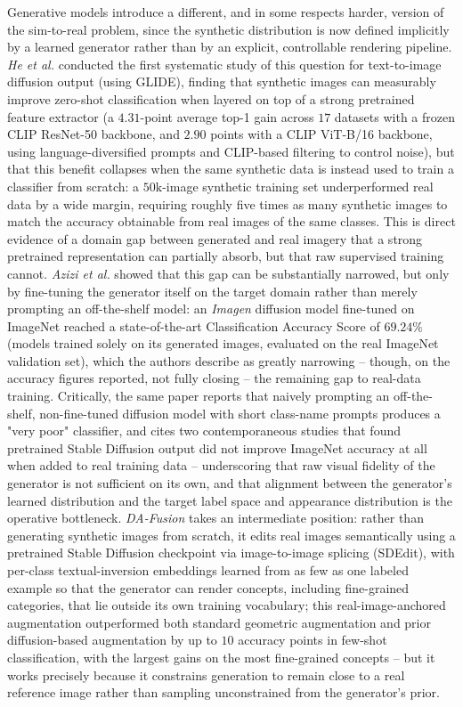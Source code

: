 Generative models introduce a different, and in some respects harder, version of the sim-to-real problem, since the synthetic distribution is now defined implicitly by a learned generator rather than by an explicit, controllable rendering pipeline. \textit{He et al.} \cite{heSyntheticDataGenerative2023} conducted the first systematic study of this question for text-to-image diffusion output (using GLIDE), finding that synthetic images can measurably improve zero-shot classification when layered on top of a strong pretrained feature extractor (a $4.31$-point average top-1 gain across $17$ datasets with a frozen CLIP ResNet-50 backbone, and $2.90$ points with a CLIP ViT-B/16 backbone, using language-diversified prompts and CLIP-based filtering to control noise), but that this benefit collapses when the same synthetic data is instead used to train a classifier from scratch: a $50\mathrm{k}$-image synthetic training set underperformed real data by a wide margin, requiring roughly five times as many synthetic images to match the accuracy obtainable from real images of the same classes. This is direct evidence of a domain gap between generated and real imagery that a strong pretrained representation can partially absorb, but that raw supervised training cannot. \textit{Azizi et al.} \cite{aziziSyntheticDataDiffusion2023} showed that this gap can be substantially narrowed, but only by fine-tuning the generator itself on the target domain rather than merely prompting an off-the-shelf model: an \textit{Imagen} diffusion model fine-tuned on ImageNet reached a state-of-the-art Classification Accuracy Score of $69.24\%$ (models trained solely on its generated images, evaluated on the real ImageNet validation set), which the authors describe as greatly narrowing -- though, on the accuracy figures reported, not fully closing -- the remaining gap to real-data training. Critically, the same paper reports that naively prompting an off-the-shelf, non-fine-tuned diffusion model with short class-name prompts produces a "very poor" classifier, and cites two contemporaneous studies that found pretrained Stable Diffusion output did not improve ImageNet accuracy at all when added to real training data -- underscoring that raw visual fidelity of the generator is not sufficient on its own, and that alignment between the generator's learned distribution and the target label space and appearance distribution is the operative bottleneck. \textit{DA-Fusion} \cite{trabuccoEffectiveDataAugmentation2025} takes an intermediate position: rather than generating synthetic images from scratch, it edits real images semantically using a pretrained Stable Diffusion checkpoint via image-to-image splicing (SDEdit), with per-class textual-inversion embeddings learned from as few as one labeled example so that the generator can render concepts, including fine-grained categories, that lie outside its own training vocabulary; this real-image-anchored augmentation outperformed both standard geometric augmentation and prior diffusion-based augmentation by up to $10$ accuracy points in few-shot classification, with the largest gains on the most fine-grained concepts -- but it works precisely because it constrains generation to remain close to a real reference image rather than sampling unconstrained from the generator's prior.

